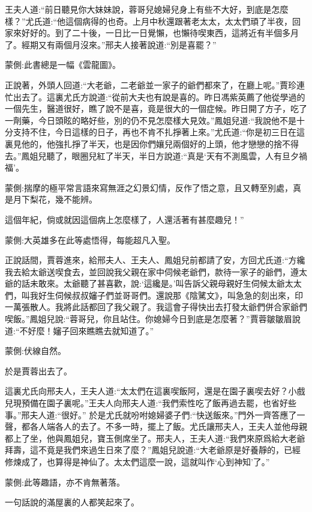\begin{parag}
    王夫人道:“前日聽見你大妹妹說，蓉哥兒媳婦兒身上有些不大好，到底是怎麼樣？”尤氏道:“他這個病得的也奇。上月中秋還跟著老太太，太太們頑了半夜，回家來好好的。到了二十後，一日比一日覺懶，也懶待喫東西，這將近有半個多月了。經期又有兩個月沒來。”邢夫人接著說道:“別是喜罷？”\begin{note}蒙側:此書總是一幅《雲龍圖》。\end{note}
\end{parag}


\begin{parag}
    正說著，外頭人回道:“大老爺，二老爺並一家子的爺們都來了，在廳上呢。”賈珍連忙出去了。這裏尤氏方說道:“從前大夫也有說是喜的。昨日馮紫英薦了他從學過的一個先生，醫道很好，瞧了說不是喜，竟是很大的一個症候。昨日開了方子，吃了一劑藥，今日頭眩的略好些，別的仍不見怎麼樣大見效。”鳳姐兒道:“我說他不是十分支持不住，今日這樣的日子，再也不肯不扎掙著上來。”尤氏道:“你是初三日在這裏見他的，他強扎掙了半天，也是因你們孃兒兩個好的上頭，他才戀戀的捨不得去。”鳳姐兒聽了，眼圈兒紅了半天，半日方說道:“真是‘天有不測風雲，人有旦夕禍福’。\begin{note}蒙側:揣摩的極平常言語來寫無涯之幻景幻情，反作了悟之意，且又轉至別處，真是月下梨花，幾不能辨。\end{note}這個年紀，倘或就因這個病上怎麼樣了，人還活著有甚麼趣兒！”\begin{note}蒙側:大英雄多在此等處悟得，每能超凡入聖。\end{note}正說話間，賈蓉進來，給邢夫人、王夫人、鳳姐兒前都請了安，方回尤氏道:“方纔我去給太爺送喫食去，並回說我父親在家中伺候老爺們，款待一家子的爺們，遵太爺的話未敢來。太爺聽了甚喜歡，說:‘這纔是。’叫告訴父親母親好生伺候太爺太太們，叫我好生伺候叔叔嬸子們並哥哥們。還說那《陰騭文》，叫急急的刻出來，印一萬張散人。我將此話都回了我父親了。我這會子得快出去打發太爺們併合家爺們喫飯。”鳳姐兒說:“蓉哥兒，你且站住。你媳婦今日到底是怎麼著？”賈蓉皺皺眉說道:“不好麼！嬸子回來瞧瞧去就知道了。”\begin{note}蒙側:伏線自然。\end{note}於是賈蓉出去了。
\end{parag}


\begin{parag}
    這裏尤氏向邢夫人，王夫人道:“太太們在這裏喫飯阿，還是在園子裏喫去好？小戲兒現預備在園子裏呢。”王夫人向邢夫人道:“我們索性吃了飯再過去罷，也省好些事。”邢夫人道:“很好。” 於是尤氏就吩咐媳婦婆子們:“快送飯來。”門外一齊答應了一聲，都各人端各人的去了。不多一時，擺上了飯。尤氏讓邢夫人，王夫人並他母親都上了坐，他與鳳姐兒，寶玉側席坐了。邢夫人，王夫人道:“我們來原爲給大老爺拜壽，這不竟是我們來過生日來了麼？”鳳姐兒說道:“大老爺原是好養靜的，已經修煉成了，也算得是神仙了。太太們這麼一說，這就叫作‘心到神知’了。”\begin{note}蒙側:此等趣語，亦不肯無著落。\end{note}一句話說的滿屋裏的人都笑起來了。
\end{parag}


